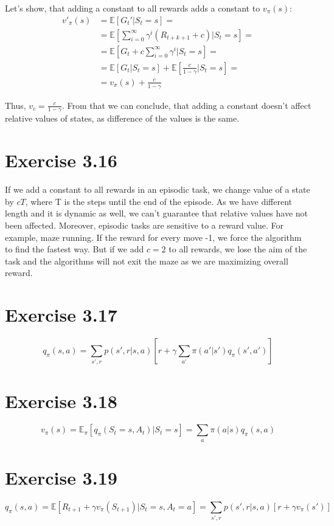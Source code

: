 \documentclass[12pt, a4paper]{article}
\begin{document}
        Let's show, that adding a constant to all rewards adds a constant to $v_\pi(s)$:
        \begin{align*}
            v'_\pi(s) &= \mathbb{E}[G_t'|S_t = s] =\\
            &= \mathbb{E}[\sum\limits_{i=0}^{\infty}\gamma^i(R_{t+k+1} + c)|S_t = s] =\\
            &= \mathbb{E}[G_t + c \sum\limits_{i=0}^{\infty}\gamma^i|S_t = s] =\\
            &= \mathbb{E}[G_t|S_t=s] + \mathbb{E}[\frac{c}{1 - \gamma}|S_t=s] =\\
            &= v_\pi(s) + \frac{c}{1-\gamma}
        \end{align*}

        Thus, $v_c = \frac{c}{1 - \gamma}$. From that we can conclude, that
        adding a constant doesn't affect relative values of states, as difference
        of the values is the same.

    \section{Exercise 3.16}
        If we add a constant to all rewards in an episodic task, we change value
        of a state by $cT$, where T is the steps until the end of the episode.
        As we have different length and it is dynamic as well, we can't guarantee
        that relative values have not been affected. Moreover, episodic tasks are
        sensitive to a reward value. For example, maze running. If the reward for
        every move -1, we force the algorithm to find the fastest way. But if we
        add $c=2$ to all rewards, we lose the aim of the task and the algorithms
        will not exit the maze as we are maximizing overall reward.

    \section{Exercise 3.17}
        $$q_\pi(s,a) = \sum\limits_{s',r} p(s',r|s,a)[r +
        \gamma \sum\limits_{a'} \pi(a'|s') q_\pi(s',a')]$$

    \section{Exercise 3.18}
        $$v_{\pi}(s) = \mathbb{E}_\pi[q_\pi(S_{t} = s, A_{t})|S_t=s] =
        \sum\limits_a \pi(a|s) q_\pi(s, a)$$

    \section{Exercise 3.19}
        $$q_\pi(s,a) = \mathbb{E}[R_{t+1} + \gamma v_\pi(S_{t+1})|S_t=s, A_t=a] =
        \sum\limits_{s',r} p(s',r|s,a)[r + \gamma v_\pi(s')]$$
\end{document}
